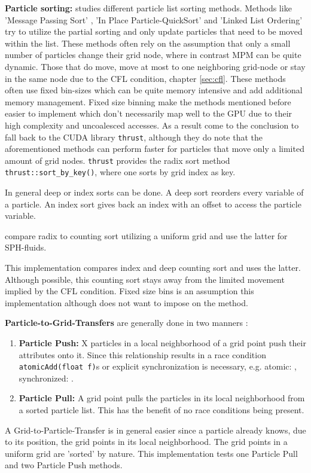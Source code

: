 \documentclass[m,times]{cgMA}
\begin{document}
\textbf{Particle sorting:} \cite{PIC:GPU} studies different particle list sorting methods. Methods like 'Message Passing Sort' \cite{kong2011particle} \cite{decyk2011adaptable}, 'In Place Particle-QuickSort' \cite{stantchev2008fast} and 'Linked List Ordering' \cite{burau2010picongpu} try to utilize the partial sorting and only update particles that need to be moved within the list. These methods often rely on the assumption that only a small number of particles change their grid node, where in contrast MPM can be quite dynamic. Those that do move, move at most to one neighboring grid-node or stay in the same node due to the CFL condition, chapter \ref{sec:cfl}. These methods often use fixed bin-sizes which can be quite memory intensive and add additional memory management. Fixed size binning make the methods mentioned before easier to implement which don't necessarily map well to the GPU due to their high complexity and uncoalesced accesses. As a result \cite{PIC:GPU} come to the conclusion to fall back to the CUDA library \texttt{thrust}, although they do note that the aforementioned methods can perform faster for particles that move only a limited amount of grid nodes. \texttt{thrust} provides the radix sort method \texttt{thrust::sort\_by\_key()}, where one sorts by grid index as key.

In general deep or index sorts can be done. A deep sort reorders every variable of a particle. An index sort gives back an index with an offset to access the particle variable.

\cite{NVIDIA:NNSEARCH} compare radix to counting sort utilizing a uniform grid and use the latter for SPH-fluids.

This implementation compares index and deep counting sort and uses the latter. Although possible, this counting sort stays away from the limited movement implied by the CFL condition. Fixed size bins is an assumption this implementation although does not want to impose on the method.

\textbf{Particle-to-Grid-Transfers} are generally done in two manners \cite{stantchev2008fast}:
\begin{enumerate}
  \item \textbf{Particle Push:} X particles in a local neighborhood of a grid point push their attributes onto it. Since this relationship results in a race condition \texttt{atomicAdd(float f)}s or explicit synchronization is necessary, e.g. a\-tomic: \cite{PIC:GPU}, synchronized: \cite{FRANCESCO:ROSSI}.
  \item \textbf{Particle Pull:} A grid point pulls the particles in its local neighborhood from a sorted particle list. This has the benefit of no race conditions being present.
\end{enumerate}
A Grid-to-Particle-Transfer is in general easier since a particle already knows, due to its position, the grid points in its local neighborhood. The grid points in a uniform grid are 'sorted' by nature. This implementation tests one Particle Pull and two Particle Push methods.
\end{document}
